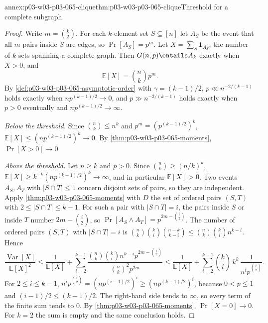 \begin{annexitem}{annex:p03-w03-p03-065-clique}{thm:p03-w03-p03-065-clique}{Threshold for a complete subgraph}
\begin{proof}
Write \(m=\binom k2\).  For each \(k\)-element set \(S\subseteq[n]\) let
\(A_S\) be the event that all \(m\) pairs inside \(S\) are edges, so
\(\Pr[A_S]=p^m\).  Let \(X=\sum_S\mathbf 1_{A_S}\), the number of \(k\)-sets
spanning a complete graph.  Then \(G(n,p)\entails A_k\) exactly when
\(X>0\), and
\[
  \mathbb E[X]=\binom nk p^m .
\]
By \cref{def:p03-w03-p03-065-asymptotic-order} with
\(\gamma=(k-1)/2\), \(p\ll n^{-2/(k-1)}\) holds exactly when
\(np^{(k-1)/2}\to0\), and \(p\gg n^{-2/(k-1)}\) holds exactly when
\(p>0\) eventually and \(np^{(k-1)/2}\to\infty\).

\emph{Below the threshold.}  Since \(\binom nk\leq n^k\) and
\(p^m=(p^{(k-1)/2})^k\),
\(\mathbb E[X]\leq(np^{(k-1)/2})^k\to0\).  By
\cref{thm:p03-w03-p03-065-moments}, \(\Pr[X>0]\to0\).

\emph{Above the threshold.}  Let \(n\geq k\) and \(p>0\).  Since
\(\binom nk\geq(n/k)^k\),
\(\mathbb E[X]\geq k^{-k}(np^{(k-1)/2})^k\to\infty\), and in particular
\(\mathbb E[X]>0\).  Two events \(A_S,A_T\) with \(|S\cap T|\leq1\) concern
disjoint sets of pairs, so they are independent.  Apply
\cref{thm:p03-w03-p03-065-moments} with \(D\) the set of ordered pairs
\((S,T)\) with \(2\leq|S\cap T|\leq k-1\).  For such a pair with
\(|S\cap T|=i\), the pairs inside \(S\) or inside \(T\) number
\(2m-\binom i2\), so \(\Pr[A_S\wedge A_T]=p^{2m-\binom i2}\).  The number of
ordered pairs \((S,T)\) with \(|S\cap T|=i\) is
\(\binom nk\binom ki\binom{n-k}{k-i}\leq\binom nk\binom ki n^{k-i}\).  Hence
\[
  \frac{\operatorname{Var}[X]}{\mathbb E[X]^2}
  \leq\frac1{\mathbb E[X]}
  +\sum_{i=2}^{k-1}\frac{\binom nk\binom ki n^{k-i}p^{2m-\binom i2}}
                        {\binom nk^2p^{2m}}
  \leq\frac1{\mathbb E[X]}
  +\sum_{i=2}^{k-1}\binom ki\,k^k\,\frac1{n^ip^{\binom i2}} .
\]
For \(2\leq i\leq k-1\),
\(n^ip^{\binom i2}=(np^{(i-1)/2})^i\geq(np^{(k-1)/2})^i\), because
\(0<p\leq1\) and \((i-1)/2\leq(k-1)/2\).  The right-hand side tends to
\(\infty\), so every term of the finite sum tends to \(0\).  By
\cref{thm:p03-w03-p03-065-moments}, \(\Pr[X=0]\to0\).  For \(k=2\) the sum
is empty and the same conclusion holds.
\end{proof}
\end{annexitem}

